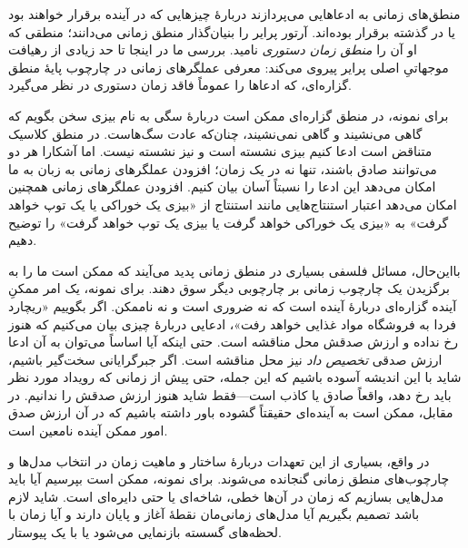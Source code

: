 \documentclass[../../../include/open-logic-section]{subfiles}
\begin{document}


منطق‌های زمانی به ادعاهایی می‌پردازند دربارهٔ چیزهایی که در آینده
برقرار خواهند بود یا در گذشته برقرار بوده‌اند. آرتور پرایر را بنیان‌گذار
منطق زمانی می‌دانند؛ منطقی که او آن را \emph{منطق زمان دستوری} نامید.
بررسی ما در اینجا تا حد زیادی از رهیافت موجهاتیِ اصلی پرایر پیروی
می‌کند: معرفی عملگرهای زمانی در چارچوب پایهٔ منطق گزاره‌ای، که ادعاها
را عموماً فاقد زمان دستوری در نظر می‌گیرد.

برای نمونه، در منطق گزاره‌ای ممکن است دربارهٔ سگی به نام بیزی سخن
بگویم که گاهی می‌نشیند و گاهی نمی‌نشیند، چنان‌که عادت سگ‌هاست. در منطق
کلاسیک متناقض است ادعا کنیم بیزی نشسته است و نیز نشسته نیست. اما
آشکارا هر دو می‌توانند صادق باشند، تنها نه در یک زمان؛ افزودن عملگرهای
زمانی به زبان به ما امکان می‌دهد این ادعا را نسبتاً آسان بیان کنیم.
افزودن عملگرهای زمانی همچنین امکان می‌دهد اعتبار استنتاج‌هایی مانند
استنتاج از «بیزی یک خوراکی یا یک توپ خواهد گرفت» به «بیزی یک خوراکی
خواهد گرفت یا بیزی یک توپ خواهد گرفت» را توضیح دهیم.

بااین‌حال، مسائل فلسفی بسیاری در منطق زمانی پدید می‌آیند که ممکن است
ما را به برگزیدن یک چارچوب زمانی بر چارچوبی دیگر سوق دهند. برای نمونه،
یک امر ممکنِ آینده گزاره‌ای دربارهٔ آینده است که نه ضروری است و نه
ناممکن. اگر بگوییم «ریچارد فردا به فروشگاه مواد غذایی خواهد رفت»،
ادعایی دربارهٔ چیزی بیان می‌کنیم که هنوز رخ نداده و ارزش صدقش محل
مناقشه است. حتی اینکه آیا اساساً می‌توان به آن ادعا ارزش صدقی
\emph{تخصیص داد} نیز محل مناقشه است. اگر جبرگرایانی سخت‌گیر باشیم، شاید
با این اندیشه آسوده باشیم که این جمله، حتی پیش از زمانی که رویداد مورد
نظر باید رخ دهد، واقعاً صادق یا کاذب است---فقط شاید هنوز ارزش صدقش را
ندانیم. در مقابل، ممکن است به آینده‌ای حقیقتاً گشوده باور داشته باشیم
که در آن ارزش صدق امور ممکن آینده نامعین است.

در واقع، بسیاری از این تعهدات دربارهٔ ساختار و ماهیت زمان در انتخاب
مدل‌ها و چارچوب‌های منطق زمانی گنجانده می‌شوند. برای نمونه، ممکن است
بپرسیم آیا باید مدل‌هایی بسازیم که زمان در آن‌ها خطی، شاخه‌ای یا حتی
دایره‌ای است. شاید لازم باشد تصمیم بگیریم آیا مدل‌های زمانی‌مان نقطهٔ
آغاز و پایان دارند و آیا زمان با لحظه‌های گسسته بازنمایی می‌شود یا با
یک پیوستار.
\end{document}

